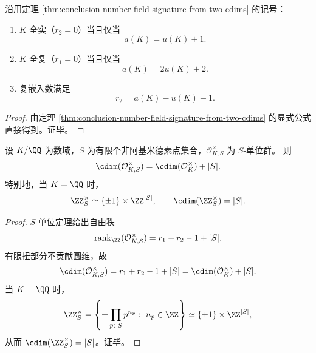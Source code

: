 \begin{corollary}[全实/全复判别与复嵌入缺口]\label{cor:conclusion-real-complex-signature-gap-criterion}
沿用定理 \ref{thm:conclusion-number-field-signature-from-two-cdims} 的记号：
\begin{enumerate}
  \item \(K\) 全实（\(r_2=0\)）当且仅当
  \[
  a(K)=u(K)+1.
  \]
  \item \(K\) 全复（\(r_1=0\)）当且仅当
  \[
  a(K)=2u(K)+2.
  \]
  \item 复嵌入数满足
  \[
  r_2=a(K)-u(K)-1.
  \]
\end{enumerate}
\end{corollary}
\begin{proof}
由定理 \ref{thm:conclusion-number-field-signature-from-two-cdims} 的显式公式直接得到。证毕。
\end{proof}

\begin{theorem}[\(S\)-单位圆维线性增长律]\label{thm:conclusion-sunit-cdim-linear-growth}
设 \(K/\QQ\) 为数域，\(S\) 为有限个非阿基米德素点集合，\(\mathcal O_{K,S}^\times\) 为 \(S\)-单位群。
则
\[
\cdim(\mathcal O_{K,S}^\times)=\cdim(\mathcal O_K^\times)+|S|.
\]
特别地，当 \(K=\QQ\) 时，
\[
\ZZ_S^\times\simeq \{\pm1\}\times \ZZ^{|S|},
\qquad
\cdim(\ZZ_S^\times)=|S|.
\]
\end{theorem}
\begin{proof}
\(S\)-单位定理给出自由秩
\[
\operatorname{rank}_{\ZZ}(\mathcal O_{K,S}^\times)=r_1+r_2-1+|S|.
\]
有限扭部分不贡献圆维，故
\[
\cdim(\mathcal O_{K,S}^\times)=r_1+r_2-1+|S|
=\cdim(\mathcal O_K^\times)+|S|.
\]
当 \(K=\QQ\) 时，
\[
\ZZ_S^\times=\left\{\pm\prod_{p\in S}p^{n_p}:\ n_p\in\ZZ\right\}
\simeq\{\pm1\}\times\ZZ^{|S|},
\]
从而 \(\cdim(\ZZ_S^\times)=|S|\)。证毕。
\end{proof}

